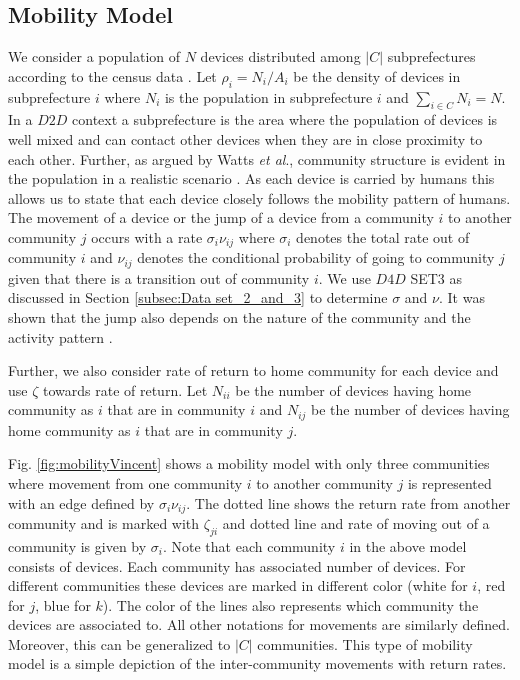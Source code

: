 \documentclass[review]{elsarticle}
\begin{document}
\subsection{Mobility Model}\label{subsec:C3_moblitymodel}
We consider a population of $N$ devices distributed among $|C|$ subprefectures according to the census data \cite{Web1}. Let $\rho_i = N_i/A_i$ be the density of devices in subprefecture $i$ where $N_i$ is the population in subprefecture $i$ and $\sum_{i\in C}N_i=N$. In a $D2D$ context a subprefecture is the area where the population of devices is well mixed and can contact other devices when they are in close proximity to each other. Further, as argued by Watts \emph{et al}., community structure is evident in the population in a realistic scenario \cite{Watts2005}. As each device is carried by humans this allows us to state that each device closely follows the mobility pattern of humans. The movement of a device or the jump of a device from a community $i$ to another community $j$ occurs with a rate $\sigma_i \nu_{ij}$ where $\sigma_i$ denotes the total rate out of community $i$ and $\nu_{ij}$ denotes the conditional probability of going to community $j$ given that there is a transition out of community $i$. We use $D4D$ SET3 as discussed in Section \ref{subsec:Data set_2_and_3} to determine $\sigma$ and $\nu$. It was shown that the jump also depends on the nature of the community \cite{Wang2012} and the activity pattern \cite{Liu2013}.

Further, we also consider rate of return to home community for each device \cite{Sattenspiel1995,Belik2011} and use $\zeta$ towards rate of return. Let $N_{ii}$ be the number of devices having home community as $i$ that are in community $i$ and $N_{ij}$ be the number of devices having home community as $i$ that are in community $j$.

Fig. \ref{fig:mobilityVincent} shows a mobility model with only three communities where movement from one community $i$ to another community $j$ is represented with an edge defined by $\sigma_{i}\nu_{ij}$. The dotted line shows the return rate from another community and is marked with $\zeta_{ji}$ and dotted line and rate of moving out of a community is given by $\sigma_i$. Note that each community $i$ in the above model consists of devices. Each community has associated number of devices. For different communities these devices are marked in different color (white for $i$, red for $j$, blue for $k$). The color of the lines also represents which community the devices are associated to. All other notations for movements are similarly defined. Moreover, this can be generalized to $|C|$ communities. This type of mobility model is a simple depiction of the inter-community movements with return rates.
\end{document}
